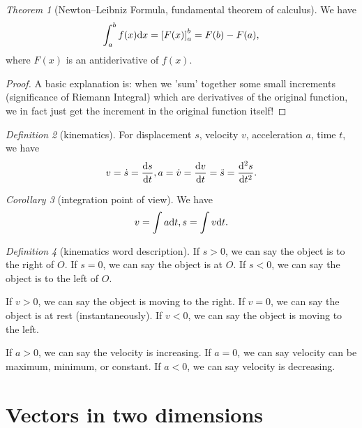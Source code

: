 \documentclass[8pt]{article}
\theoremstyle{remark}
\newtheorem{theorem}{Theorem}[section]
\newtheorem{corollary}[theorem]{Corollary}
\newtheorem{definition}[theorem]{Definition}
\begin{document}
            \begin{theorem}[Newton--Leibniz Formula, fundamental theorem of calculus]
                We have
                $$
                    \int_a^b f(x) \mathrm{d} x = \left[F(x)\right]_a^b = F(b) - F(a),
                $$
                where $F(x)$ is an antiderivative of $f(x)$.
                \begin{proof}
                    A basic explanation is: when we 'sum' together some small increments (significance of Riemann Integral) which are derivatives of the original function, we in fact just get the increment in the original function itself!
                \end{proof}
            \end{theorem}

            \begin{definition}[kinematics]
                For displacement $s$, velocity $v$, acceleration $a$, time $t$, we have
                $$
                    v = \dot{s} = \frac{\mathrm{d} s}{\mathrm{d} t}, a = \dot{v} = \frac{\mathrm{d} v}{\mathrm{d} t} = \ddot{s} = \frac{\mathrm{d}^2 s}{\mathrm{d} t^2}.
                $$
            \end{definition}

            \begin{corollary}[integration point of view]
                We have
                $$
                    v = \int a \mathrm{d} t, s = \int v \mathrm{d} t.
                $$
            \end{corollary}

            \begin{definition}[kinematics word description]
                If $s > 0$, we can say the object is to the right of $O$. If $s = 0$, we can say the object is at $O$. If $s < 0$, we can say the object is to the left of $O$.

                If $v > 0$, we can say the object is moving to the right. If $v = 0$, we can say the object is at rest (instantaneously). If $v < 0$, we can say the object is moving to the left.

                If $a > 0$, we can say the velocity is increasing. If $a = 0$, we can say velocity can be maximum, minimum, or constant. If $a < 0$, we can say velocity is decreasing.
            \end{definition}

    \section{Vectors in two dimensions}
\end{document}
